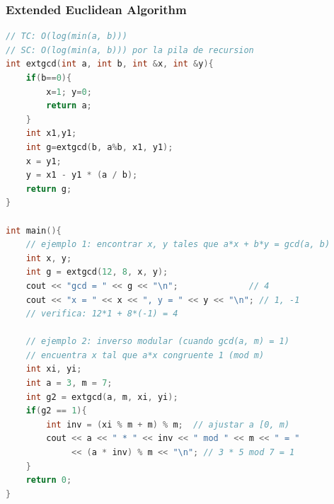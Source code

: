 \subsubsection{Extended Euclidean Algorithm}
\begin{lstlisting}[style=mystyle, language=C++]
// TC: O(log(min(a, b)))
// SC: O(log(min(a, b))) por la pila de recursion
int extgcd(int a, int b, int &x, int &y){
	if(b==0){
		x=1; y=0;
		return a;
	}
	int x1,y1;
	int g=extgcd(b, a%b, x1, y1);
	x = y1;
	y = x1 - y1 * (a / b);
	return g;
}

int main(){
	// ejemplo 1: encontrar x, y tales que a*x + b*y = gcd(a, b)
	int x, y;
	int g = extgcd(12, 8, x, y);
	cout << "gcd = " << g << "\n";              // 4
	cout << "x = " << x << ", y = " << y << "\n"; // 1, -1
	// verifica: 12*1 + 8*(-1) = 4

	// ejemplo 2: inverso modular (cuando gcd(a, m) = 1)
	// encuentra x tal que a*x congruente 1 (mod m)
	int xi, yi;
	int a = 3, m = 7;
	int g2 = extgcd(a, m, xi, yi);
	if(g2 == 1){
		int inv = (xi % m + m) % m;  // ajustar a [0, m)
		cout << a << " * " << inv << " mod " << m << " = "
		     << (a * inv) % m << "\n"; // 3 * 5 mod 7 = 1
	}
	return 0;
}
\end{lstlisting}
